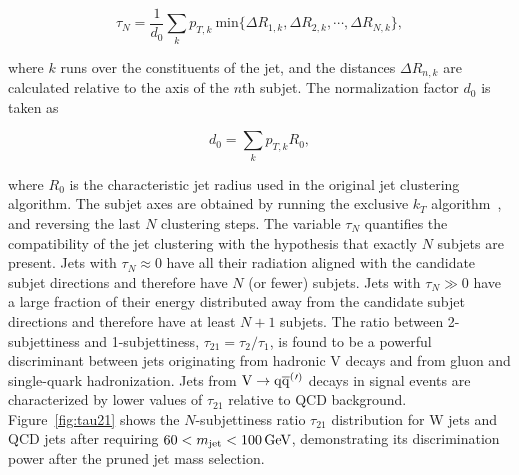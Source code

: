 \begin{equation}
\tau_N = \frac{1}{d_0} \sum_{k} p_{T,k}~\mathrm{min} \{\Delta R_{1,k},\Delta R_{2,k},\cdots,\Delta R_{N,k}\},
\end{equation}

where $k$ runs over the constituents of the jet, and the distances $\Delta R_{n,k}$ are calculated relative to the axis of the $n$th subjet. %
The normalization factor $d_0$ is taken as

\begin{equation}
d_0 = \sum_{k} p_{T,k} R_{0},
\end{equation}

where $R_0$ is the characteristic jet radius used in the original jet clustering algorithm. The subjet axes are obtained by running the exclusive $k_T$ algorithm~\cite{Ellis:1993tq}, and reversing the last $N$ clustering steps. The variable $\tau_N$ quantifies the compatibility of the jet clustering with the hypothesis that exactly $N$ subjets are present.
Jets with $\tau_N \approx 0$ have all their radiation aligned with the candidate subjet directions and therefore have $N$ (or fewer) subjets. Jets with $\tau_N \gg 0$ have a large fraction of their energy distributed away from the candidate subjet directions and therefore have at least $N+1$ subjets.
The ratio between 2-subjettiness and 1-subjettiness, $\tau_{21} = \tau_{2}/\tau_{1}$, is found to be a powerful discriminant between jets originating from hadronic V decays and from gluon and single-quark hadronization. Jets from $\mathrm{V}\to\mathrm{q}\overline{\mathrm{q}}^({}'^){}$ decays in signal events are characterized by lower values of $\tau_{21}$ relative to QCD background.
Figure~\ref{fig:tau21} shows the $N$-subjettiness ratio $\tau_{21}$ distribution for W jets and QCD jets after requiring $60 < m_{\text{jet}} < 100\,\text{Ge\hspace{-.08em}V}$, demonstrating its discrimination power after the pruned jet mass selection. %

